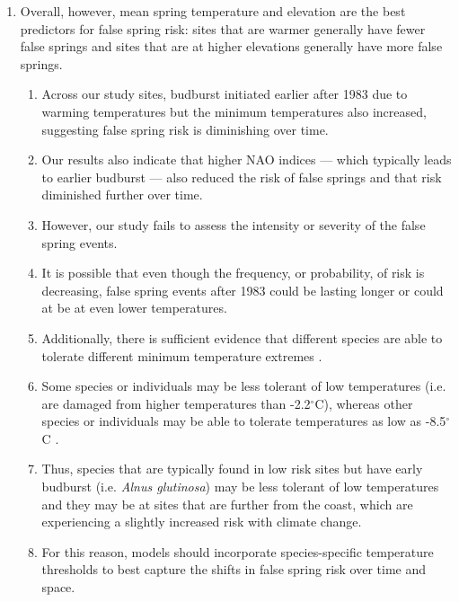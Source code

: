 \documentclass{article}\usepackage[]{graphicx}\usepackage[]{color}
\begin{document}
\begin{enumerate}
\item Overall, however, mean spring temperature and elevation are the best predictors for false spring risk: sites that are warmer generally have fewer false springs and sites that are at higher elevations generally have more false springs.
  \begin{enumerate}
  \item Across our study sites, budburst initiated earlier after 1983 due to warming temperatures but the minimum temperatures also increased, suggesting false spring risk is diminishing over time. 
  \item Our results also indicate that higher NAO indices --- which typically leads to earlier budburst --- also reduced the risk of false springs and that risk diminished further over time. 
  \item However, our study fails to assess the intensity or severity of the false spring events. 
  \item It is possible that even though the frequency, or probability, of risk is decreasing, false spring events after 1983 could be lasting longer or could at be at even lower temperatures.
  \item Additionally, there is sufficient evidence that different species are able to tolerate different minimum temperature extremes \citep{Lenz2013, Korner2016, Zhuo2018}.
  \item Some species or individuals may be less tolerant of low temperatures (i.e. are damaged from higher temperatures than -2.2$^{\circ}$C), whereas other species or individuals may be able to tolerate temperatures as low as -8.5$^{\circ}$C \citep{Lenz2016}.
  \item Thus, species that are typically found in low risk sites but have early budburst (i.e. \textit{Alnus glutinosa}) may be less tolerant of low temperatures and they may be at sites that are further from the coast, which are experiencing a slightly increased risk with climate change. 
  \item For this reason, models should incorporate species-specific temperature thresholds to best capture the shifts in false spring risk over time and space. 
  \end{enumerate}


\end{enumerate}
\end{document}
